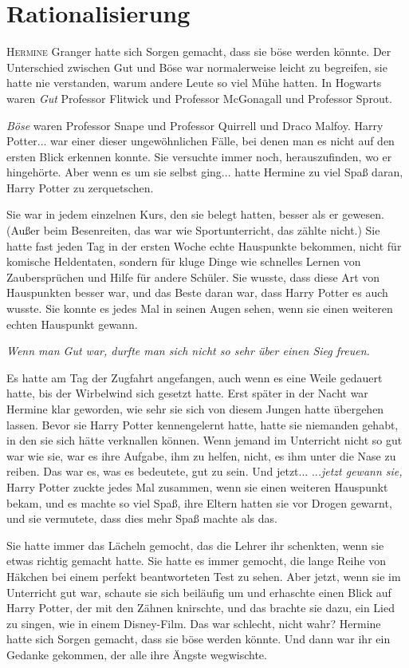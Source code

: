 \chapter{Rationalisierung}

\lettrine{H}{ermine} Granger hatte sich Sorgen gemacht, dass sie böse werden
könnte. Der Unterschied zwischen Gut und Böse war normalerweise leicht zu
begreifen, sie hatte nie verstanden, warum andere Leute so viel Mühe hatten. In
Hogwarts waren \glqq{}\emph{Gut}\grqq{} Professor Flitwick und Professor
McGonagall und Professor Sprout.

\glqq{}\emph{Böse}\grqq{} waren Professor Snape und Professor Quirrell und Draco
Malfoy. Harry Potter... war einer dieser ungewöhnlichen Fälle, bei denen man es
nicht auf den ersten Blick erkennen konnte. Sie versuchte immer noch,
herauszufinden, wo er hingehörte. Aber wenn es um sie selbst ging... hatte
Hermine zu viel Spaß daran, Harry Potter zu zerquetschen.

Sie war in jedem einzelnen Kurs, den sie belegt hatten, besser als er gewesen.
(Außer beim Besenreiten, das war wie Sportunterricht, das zählte nicht.) Sie
hatte fast jeden Tag in der ersten Woche echte Hauspunkte bekommen, nicht für
komische Heldentaten, sondern für kluge Dinge wie schnelles Lernen von
Zaubersprüchen und Hilfe für andere Schüler. Sie wusste, dass diese Art von
Hauspunkten besser war, und das Beste daran war, dass Harry Potter es auch
wusste. Sie konnte es jedes Mal in seinen Augen sehen, wenn sie einen weiteren
echten Hauspunkt gewann.

\emph{Wenn man Gut war, durfte man sich nicht so sehr über einen Sieg freuen.}

Es hatte am Tag der Zugfahrt angefangen, auch wenn es eine Weile gedauert hatte,
bis der Wirbelwind sich gesetzt hatte. Erst später in der Nacht war Hermine klar
geworden, wie sehr sie sich von diesem Jungen hatte übergehen lassen. Bevor sie
Harry Potter kennengelernt hatte, hatte sie niemanden gehabt, in den sie sich
hätte verknallen können. Wenn jemand im Unterricht nicht so gut war wie sie, war
es ihre Aufgabe, ihm zu helfen, nicht, es ihm unter die Nase zu reiben. Das war
es, was es bedeutete, gut zu sein. Und jetzt... ..\emph{.jetzt gewann sie,}
Harry Potter zuckte jedes Mal zusammen, wenn sie einen weiteren Hauspunkt bekam,
und es machte so viel Spaß, ihre Eltern hatten sie vor Drogen gewarnt, und sie
vermutete, dass dies mehr Spaß machte als das.

Sie hatte immer das Lächeln gemocht, das die Lehrer ihr schenkten, wenn sie
etwas richtig gemacht hatte. Sie hatte es immer gemocht, die lange Reihe von
Häkchen bei einem perfekt beantworteten Test zu sehen. Aber jetzt, wenn sie im
Unterricht gut war, schaute sie sich beiläufig um und erhaschte einen Blick auf
Harry Potter, der mit den Zähnen knirschte, und das brachte sie dazu, ein Lied
zu singen, wie in einem Disney-Film. Das war schlecht, nicht wahr? Hermine hatte
sich Sorgen gemacht, dass sie böse werden könnte. Und dann war ihr ein Gedanke
gekommen, der alle ihre Ängste wegwischte.

